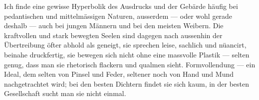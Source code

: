 Ich finde eine gewisse Hyperbolik des Ausdrucks und der Gebärde häufig bei pedantischen und mittelmässigen Naturen, ausserdem — oder wohl gerade deshalb — auch bei jungen Männern und bei den meisten Weibern. Die kraftvollen und stark bewegten Seelen sind dagegen nach aussenhin der Übertreibung öfter abhold als geneigt, sie sprechen leise, sachlich und nüancirt, beinahe druckfertig, sie bewegen sich nicht ohne eine massvolle Plastik — selten genug, dass man sie rhetorisch flackern und qualmen sieht. Formvollendung — ein Ideal, dem selten von Pinsel und Feder, seltener noch von Hand und Mund nachgetrachtet wird; bei den besten Dichtern findet sie sich kaum, in der besten Gesellschaft sucht man sie nicht einmal.
\par

